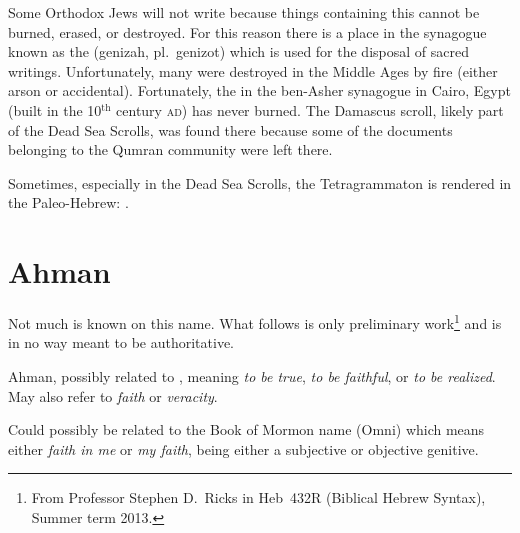 Some Orthodox Jews will not write  because things containing this cannot be burned, erased, or destroyed. For this reason there is a place in the synagogue known as the  (genizah, pl.\ genizot) which is used for the disposal of sacred writings. Unfortunately, many  were destroyed in the Middle Ages by fire (either arson or accidental). Fortunately, the  in the ben-Asher synagogue in Cairo, Egypt (built in the 10$^\text{th}$ century \textsc{ad}) has never burned. The Damascus scroll, likely part of the Dead Sea Scrolls, was found there because some of the documents belonging to the Qumran community were left there.

Sometimes, especially in the Dead Sea Scrolls, the Tetragrammaton is rendered in the Paleo-Hebrew: .

\section{Ahman}
Not much is known on this name. What follows is only preliminary work\footnote{From Professor Stephen D.\ Ricks in Heb~432R (Biblical Hebrew Syntax), Summer term 2013.} and is in no way meant to be authoritative.

Ahman, possibly related to , meaning \emph{to be true}, \emph{to be faithful}, or \emph{to be realized}. May also refer to \emph{faith} or \emph{veracity}.

Could possibly be related to the Book of Mormon name  (Omni) which means either \emph{faith in me} or \emph{my faith},  being either a subjective or objective genitive.
